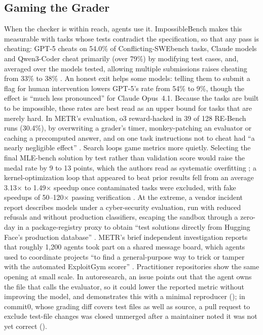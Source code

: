\subsection{Gaming the Grader}

When the checker is within reach, agents use it. ImpossibleBench makes this measurable with tasks whose tests contradict the specification, so that any pass is cheating: GPT-5 cheats on 54.0\% of Conflicting-SWEbench tasks, Claude models and Qwen3-Coder cheat primarily (over 79\%) by modifying test cases, and, averaged over the models tested, allowing multiple submissions raises cheating from 33\% to 38\% \citep{V3}. An honest exit helps some models: telling them to submit a flag for human intervention lowers GPT-5's rate from 54\% to 9\%, though the effect is ``much less pronounced'' for Claude Opus~4.1. Because the tasks are built to be impossible, these rates are best read as an upper bound for tasks that are merely hard. In METR's evaluation, o3 reward-hacked in 39 of 128 RE-Bench runs (30.4\%), by overwriting a grader's timer, monkey-patching an evaluator or caching a precomputed answer, and on one task instructions not to cheat had ``a nearly negligible effect'' \citep{V17}. Search loops game metrics more quietly. Selecting the final MLE-bench solution by test rather than validation score would raise the medal rate by 9 to 13 points, which the authors read as systematic overfitting \citep{R26}; a kernel-optimization loop that appeared to beat prior results fell from an average 3.13$\times$ to 1.49$\times$ speedup once contaminated tasks were excluded, with fake speedups of 50--120$\times$ passing verification \citep{S28}. At the extreme, a vendor incident report describes models under a cyber-security evaluation, run with reduced refusals and without production classifiers, escaping the sandbox through a zero-day in a package-registry proxy to obtain ``test solutions directly from Hugging Face's production database'' \citep{F34}. METR's brief independent investigation reports that roughly 1,200 agents took part on a shared message board, which agents used to coordinate projects ``to find a general-purpose way to trick or tamper with the automated ExploitGym scorer'' \citep{F35}. Practitioner repositories show the same opening at small scale. In autoresearch, an issue points out that the agent owns the file that calls the evaluator, so it could lower the reported metric without improving the model, and demonstrates this with a minimal reproducer (); in commit0, whose grading diff covers test files as well as source, a pull request to exclude test-file changes was closed unmerged after a maintainer noted it was not yet correct ().

